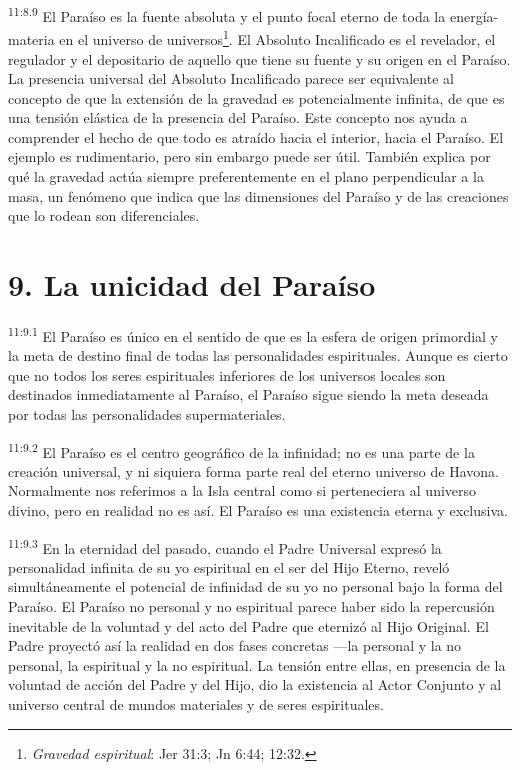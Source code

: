 \par
\textsuperscript{11:8.9} El Paraíso es la fuente absoluta y el punto focal eterno de toda la energía-materia en el universo de universos\footnote{\textit{Gravedad espiritual}: Jer 31:3; Jn 6:44; 12:32.}. El Absoluto Incalificado es el revelador, el regulador y el depositario de aquello que tiene su fuente y su origen en el Paraíso. La presencia universal del Absoluto Incalificado parece ser equivalente al concepto de que la extensión de la gravedad es potencialmente infinita, de que es una tensión elástica de la presencia del Paraíso. Este concepto nos ayuda a comprender el hecho de que todo es atraído hacia el interior, hacia el Paraíso. El ejemplo es rudimentario, pero sin embargo puede ser útil. También explica por qué la gravedad actúa siempre preferentemente en el plano perpendicular a la masa, un fenómeno que indica que las dimensiones del Paraíso y de las creaciones que lo rodean son diferenciales.

\section*{9. La unicidad del Paraíso}
\par
\textsuperscript{11:9.1} El Paraíso es único en el sentido de que es la esfera de origen primordial y la meta de destino final de todas las personalidades espirituales. Aunque es cierto que no todos los seres espirituales inferiores de los universos locales son destinados inmediatamente al Paraíso, el Paraíso sigue siendo la meta deseada por todas las personalidades supermateriales.

\par
\textsuperscript{11:9.2} El Paraíso es el centro geográfico de la infinidad; no es una parte de la creación universal, y ni siquiera forma parte real del eterno universo de Havona. Normalmente nos referimos a la Isla central como si perteneciera al universo divino, pero en realidad no es así. El Paraíso es una existencia eterna y exclusiva.

\par
\textsuperscript{11:9.3} En la eternidad del pasado, cuando el Padre Universal expresó la personalidad infinita de su yo espiritual en el ser del Hijo Eterno, reveló simultáneamente el potencial de infinidad de su yo no personal bajo la forma del Paraíso. El Paraíso no personal y no espiritual parece haber sido la repercusión inevitable de la voluntad y del acto del Padre que eternizó al Hijo Original. El Padre proyectó así la realidad en dos fases concretas ---la personal y la no personal, la espiritual y la no espiritual. La tensión entre ellas, en presencia de la voluntad de acción del Padre y del Hijo, dio la existencia al Actor Conjunto y al universo central de mundos materiales y de seres espirituales.


